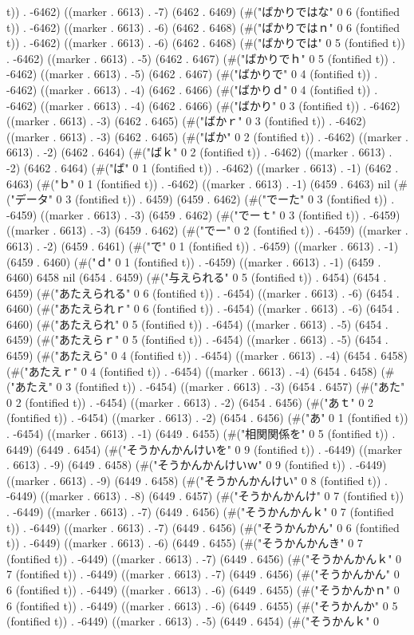 t)) . -6462) ((marker . 6613) . -7) (6462 . 6469) (#("ばかりではな" 0 6 (fontified t)) . -6462) ((marker . 6613) . -6) (6462 . 6468) (#("ばかりではｎ" 0 6 (fontified t)) . -6462) ((marker . 6613) . -6) (6462 . 6468) (#("ばかりでは" 0 5 (fontified t)) . -6462) ((marker . 6613) . -5) (6462 . 6467) (#("ばかりでｈ" 0 5 (fontified t)) . -6462) ((marker . 6613) . -5) (6462 . 6467) (#("ばかりで" 0 4 (fontified t)) . -6462) ((marker . 6613) . -4) (6462 . 6466) (#("ばかりｄ" 0 4 (fontified t)) . -6462) ((marker . 6613) . -4) (6462 . 6466) (#("ばかり" 0 3 (fontified t)) . -6462) ((marker . 6613) . -3) (6462 . 6465) (#("ばかｒ" 0 3 (fontified t)) . -6462) ((marker . 6613) . -3) (6462 . 6465) (#("ばか" 0 2 (fontified t)) . -6462) ((marker . 6613) . -2) (6462 . 6464) (#("ばｋ" 0 2 (fontified t)) . -6462) ((marker . 6613) . -2) (6462 . 6464) (#("ば" 0 1 (fontified t)) . -6462) ((marker . 6613) . -1) (6462 . 6463) (#("ｂ" 0 1 (fontified t)) . -6462) ((marker . 6613) . -1) (6459 . 6463) nil (#("データ" 0 3 (fontified t)) . 6459) (6459 . 6462) (#("でーた" 0 3 (fontified t)) . -6459) ((marker . 6613) . -3) (6459 . 6462) (#("でーｔ" 0 3 (fontified t)) . -6459) ((marker . 6613) . -3) (6459 . 6462) (#("でー" 0 2 (fontified t)) . -6459) ((marker . 6613) . -2) (6459 . 6461) (#("で" 0 1 (fontified t)) . -6459) ((marker . 6613) . -1) (6459 . 6460) (#("ｄ" 0 1 (fontified t)) . -6459) ((marker . 6613) . -1) (6459 . 6460) 6458 nil (6454 . 6459) (#("与えられる" 0 5 (fontified t)) . 6454) (6454 . 6459) (#("あたえられる" 0 6 (fontified t)) . -6454) ((marker . 6613) . -6) (6454 . 6460) (#("あたえられｒ" 0 6 (fontified t)) . -6454) ((marker . 6613) . -6) (6454 . 6460) (#("あたえられ" 0 5 (fontified t)) . -6454) ((marker . 6613) . -5) (6454 . 6459) (#("あたえらｒ" 0 5 (fontified t)) . -6454) ((marker . 6613) . -5) (6454 . 6459) (#("あたえら" 0 4 (fontified t)) . -6454) ((marker . 6613) . -4) (6454 . 6458) (#("あたえｒ" 0 4 (fontified t)) . -6454) ((marker . 6613) . -4) (6454 . 6458) (#("あたえ" 0 3 (fontified t)) . -6454) ((marker . 6613) . -3) (6454 . 6457) (#("あた" 0 2 (fontified t)) . -6454) ((marker . 6613) . -2) (6454 . 6456) (#("あｔ" 0 2 (fontified t)) . -6454) ((marker . 6613) . -2) (6454 . 6456) (#("あ" 0 1 (fontified t)) . -6454) ((marker . 6613) . -1) (6449 . 6455) (#("相関関係を" 0 5 (fontified t)) . 6449) (6449 . 6454) (#("そうかんかんけいを" 0 9 (fontified t)) . -6449) ((marker . 6613) . -9) (6449 . 6458) (#("そうかんかんけいｗ" 0 9 (fontified t)) . -6449) ((marker . 6613) . -9) (6449 . 6458) (#("そうかんかんけい" 0 8 (fontified t)) . -6449) ((marker . 6613) . -8) (6449 . 6457) (#("そうかんかんけ" 0 7 (fontified t)) . -6449) ((marker . 6613) . -7) (6449 . 6456) (#("そうかんかんｋ" 0 7 (fontified t)) . -6449) ((marker . 6613) . -7) (6449 . 6456) (#("そうかんかん" 0 6 (fontified t)) . -6449) ((marker . 6613) . -6) (6449 . 6455) (#("そうかんかんき" 0 7 (fontified t)) . -6449) ((marker . 6613) . -7) (6449 . 6456) (#("そうかんかんｋ" 0 7 (fontified t)) . -6449) ((marker . 6613) . -7) (6449 . 6456) (#("そうかんかん" 0 6 (fontified t)) . -6449) ((marker . 6613) . -6) (6449 . 6455) (#("そうかんかｎ" 0 6 (fontified t)) . -6449) ((marker . 6613) . -6) (6449 . 6455) (#("そうかんか" 0 5 (fontified t)) . -6449) ((marker . 6613) . -5) (6449 . 6454) (#("そうかんｋ" 0 